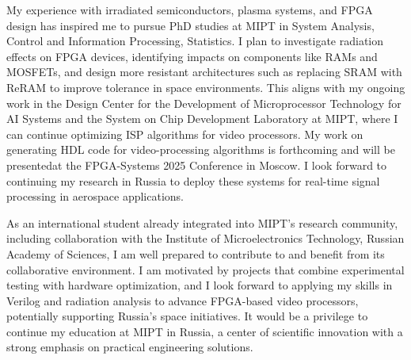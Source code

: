 \documentclass[a4paper,12pt]{article}
\begin{document}
\vspace{10pt}
My experience with irradiated semiconductors, plasma systems, and FPGA design has inspired me to pursue PhD studies at MIPT in System Analysis, Control and Information Processing, Statistics. I plan to investigate radiation effects on FPGA devices, identifying impacts on components like RAMs and MOSFETs, and design more resistant architectures such as replacing SRAM with ReRAM to improve tolerance in space environments. This aligns with my ongoing work in the Design Center for the Development of Microprocessor Technology for AI Systems and the System on Chip Development Laboratory at MIPT, where I can continue optimizing ISP algorithms for video processors. My work on generating HDL code for video-processing algorithms is forthcoming and will be presented\footnotemark[2] at the FPGA-Systems 2025 Conference in Moscow. I look forward to continuing my research in Russia to deploy these systems for real-time signal processing in aerospace applications.
\vspace{10pt}

As an international student already integrated into MIPT's research community, including collaboration with the Institute of Microelectronics Technology, Russian Academy of Sciences, I am well prepared to contribute to and benefit from its collaborative environment. I am motivated by projects that combine experimental testing with hardware optimization, and I look forward to applying my skills in Verilog and radiation analysis to advance FPGA-based video processors, potentially supporting Russia's space initiatives. It would be a privilege to continue my education at MIPT in Russia, a center of scientific innovation with a strong emphasis on practical engineering solutions.

\end{document}
